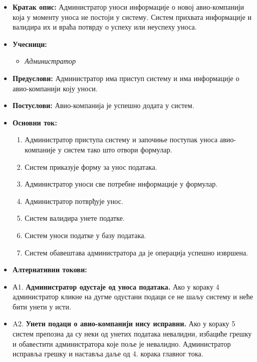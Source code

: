 \documentclass{article}
\begin{document}
\begin{itemize}
    \item \textbf{Кратак опис:} Администратор уноси информације о новој авио-компанији која у моменту уноса не постоји у систему. Систем прихвата информације и валидира их и враћа потврду о успеху или неуспеху уноса.
    \item \textbf{Учесници:}
        \begin{itemize}
            \item \textit{Администратор}
        \end{itemize}
    \item \textbf{Предуслови:} Администратор има приступ систему и има информације о авио-компанији коју уноси.
    \item \textbf{Постуслови:} Авио-компанија је успешно додата у систем.
    \item \textbf{Основни ток:}
        \begin{enumerate}
            \item Администратор приступа систему и започиње поступак уноса авио-компаније у систем тако што отвори формулар.
            \item Систем приказује форму за унос података.
            \item Администратор уноси све потребне информације у формулар.
            \item Администратор потврђује унос.
            \item Систем валидира унете податке.
            \item Систем уноси податке у базу података.
            \item Систем обавештава администратора да је операција успешно извршена.
        \end{enumerate}
    
    \item \textbf{Алтернативни токови:}
    \item А1. \textbf{Администратор одустаје од уноса података.} Ако у кораку 4 администратор кликне на дугме одустани подаци се не шаљу систему и неће бити унети у исти.
    \item A2. \textbf{Унети подаци о авио-компанији нису исправни.} Ако у кораку 5 систем препозна да су неки од унетих података невалидни, избациће грешку и обавестити администратора које поље је невалидно. Администратор исправља грешку и наставља даље од 4. корака главног тока. 
\end{itemize}
\end{document}
